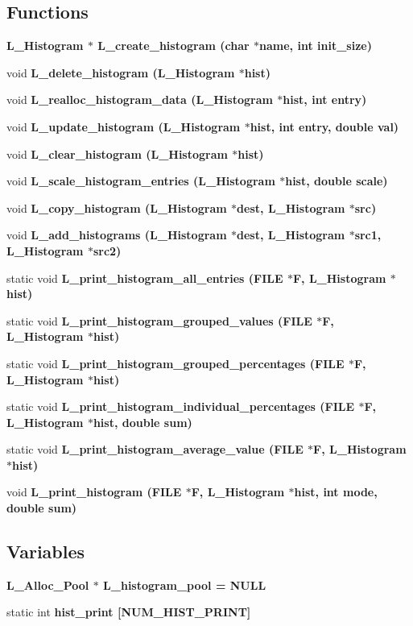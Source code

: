 \subsection*{Functions}
\begin{CompactItemize}
\item 
\bf{L\_\-Histogram} $\ast$ \bf{L\_\-create\_\-histogram} (char $\ast$\bf{name}, int init\_\-size)
\item 
void \bf{L\_\-delete\_\-histogram} (\bf{L\_\-Histogram} $\ast$hist)
\item 
void \bf{L\_\-realloc\_\-histogram\_\-data} (\bf{L\_\-Histogram} $\ast$hist, int \bf{entry})
\item 
void \bf{L\_\-update\_\-histogram} (\bf{L\_\-Histogram} $\ast$hist, int \bf{entry}, double val)
\item 
void \bf{L\_\-clear\_\-histogram} (\bf{L\_\-Histogram} $\ast$hist)
\item 
void \bf{L\_\-scale\_\-histogram\_\-entries} (\bf{L\_\-Histogram} $\ast$hist, double scale)
\item 
void \bf{L\_\-copy\_\-histogram} (\bf{L\_\-Histogram} $\ast$dest, \bf{L\_\-Histogram} $\ast$src)
\item 
void \bf{L\_\-add\_\-histograms} (\bf{L\_\-Histogram} $\ast$dest, \bf{L\_\-Histogram} $\ast$src1, \bf{L\_\-Histogram} $\ast$src2)
\item 
static void \bf{L\_\-print\_\-histogram\_\-all\_\-entries} (FILE $\ast$\bf{F}, \bf{L\_\-Histogram} $\ast$hist)
\item 
static void \bf{L\_\-print\_\-histogram\_\-grouped\_\-values} (FILE $\ast$\bf{F}, \bf{L\_\-Histogram} $\ast$hist)
\item 
static void \bf{L\_\-print\_\-histogram\_\-grouped\_\-percentages} (FILE $\ast$\bf{F}, \bf{L\_\-Histogram} $\ast$hist)
\item 
static void \bf{L\_\-print\_\-histogram\_\-individual\_\-percentages} (FILE $\ast$\bf{F}, \bf{L\_\-Histogram} $\ast$hist, double sum)
\item 
static void \bf{L\_\-print\_\-histogram\_\-average\_\-value} (FILE $\ast$\bf{F}, \bf{L\_\-Histogram} $\ast$hist)
\item 
void \bf{L\_\-print\_\-histogram} (FILE $\ast$\bf{F}, \bf{L\_\-Histogram} $\ast$hist, int \bf{mode}, double sum)
\end{CompactItemize}
\subsection*{Variables}
\begin{CompactItemize}
\item 
\bf{L\_\-Alloc\_\-Pool} $\ast$ \bf{L\_\-histogram\_\-pool} = NULL
\item 
static int \bf{hist\_\-print} [NUM\_\-HIST\_\-PRINT]
\end{CompactItemize}


